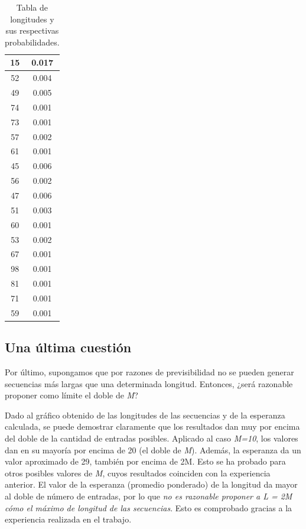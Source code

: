 \documentclass{article}
\begin{document}
\begin{table}[!hbt]
\begin{center}
\begin{tabular}{|c|c|}
		\hline
		15 & 0.017 \\
		\hline
		52 & 0.004 \\
		\hline
		49 & 0.005 \\
		\hline
		74 & 0.001 \\
		\hline
		73 & 0.001 \\
		\hline
		57 & 0.002 \\
		\hline
		61 & 0.001 \\
		\hline
		45 & 0.006 \\
		\hline
		56 & 0.002 \\
		\hline
		47 & 0.006 \\
		\hline
		51 & 0.003 \\
		\hline
		60 & 0.001 \\
		\hline
		53 & 0.002 \\
		\hline
		67 & 0.001 \\
		\hline
		98 & 0.001 \\
		\hline
		81 & 0.001 \\
		\hline
		71 & 0.001 \\
		\hline
		59 & 0.001 \\
		\hline
	\end{tabular}
	\caption{Tabla de longitudes y sus respectivas probabilidades.}
	\end{center}
\end{table}
\bigskip




\subsection{Una última cuestión}

Por último, supongamos que por razones de previsibilidad no se pueden generar secuencias más largas que una determinada longitud. Entonces, ¿será razonable proponer como límite el doble de \textit{M}?
	\par
	Dado al gráfico obtenido de las longitudes de las secuencias y de la esperanza calculada, se puede demostrar claramente que los resultados dan muy por encima del doble de la cantidad de entradas posibles. Aplicado al caso \textit{M=10}, los valores dan en su mayoría por encima de 20 (el doble de \textit{M}). Además, la esperanza da un valor aproximado de 29, también por encima de 2M. Esto se ha probado para otros posibles valores de \textit{M}, cuyos resultados coinciden con la experiencia anterior. El valor de la esperanza (promedio ponderado) de la longitud da mayor al doble de número de entradas, por lo que \textit{no es razonable proponer a L = 2M cómo el máximo de longitud de las secuencias}. Esto es comprobado gracias a la experiencia realizada en el trabajo.
\end{document}
